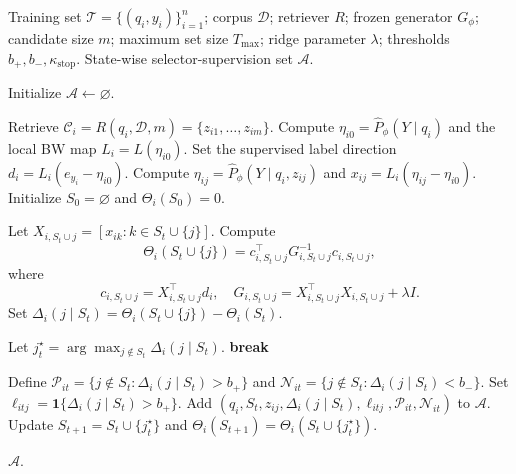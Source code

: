 \documentclass[UTF8,a4paper,12pt,oneside]{ctexart}
\numberwithin{equation}{section}
\begin{document}
\begin{algorithm}[t]
\caption{CBWDM Greedy Teacher for Selector Supervision}
\label{alg:cbwdm-teacher}
\small
\begin{algorithmic}[1]
\REQUIRE Training set $\mathcal T=\{(q_i,y_i)\}_{i=1}^n$; corpus $\mathcal D$; retriever $R$; frozen generator $G_\phi$; candidate size $m$; maximum set size $T_{\max}$; ridge parameter $\lambda$; thresholds $b_+,b_-,\kappa_{\mathrm{stop}}$.
\ENSURE State-wise selector-supervision set $\mathcal A$.

\STATE Initialize $\mathcal A\leftarrow\varnothing$.

    \STATE Retrieve $\mathcal C_i=R(q_i,\mathcal D,m)=\{z_{i1},\ldots,z_{im}\}$.
    \STATE Compute $\eta_{i0}=\widehat P_\phi(Y\mid q_i)$ and the local BW map $L_i=L(\eta_{i0})$.
    \STATE Set the supervised label direction $d_i=L_i(e_{y_i}-\eta_{i0})$.
        \STATE Compute $\eta_{ij}=\widehat P_\phi(Y\mid q_i,z_{ij})$ and $x_{ij}=L_i(\eta_{ij}-\eta_{i0})$.
    \ENDFOR
    \STATE Initialize $S_0=\varnothing$ and $\Theta_i(S_0)=0$.

            \STATE Let $X_{i,S_t\cup j}=[x_{ik}:k\in S_t\cup\{j\}]$.
            \STATE Compute
            \[
            \Theta_i(S_t\cup\{j\})
            =
            c_{i,S_t\cup j}^{\top}
            G_{i,S_t\cup j}^{-1}
            c_{i,S_t\cup j},
            \]
            where
            \[
            c_{i,S_t\cup j}=X_{i,S_t\cup j}^{\top}d_i,
            \quad
            G_{i,S_t\cup j}=X_{i,S_t\cup j}^{\top}X_{i,S_t\cup j}+\lambda I.
            \]
            \STATE Set $\Delta_i(j\mid S_t)=\Theta_i(S_t\cup\{j\})-\Theta_i(S_t)$.
        \ENDFOR

        \STATE Let $j_t^\star=\arg\max_{j\notin S_t}\Delta_i(j\mid S_t)$.
            \STATE \textbf{break}
        \ENDIF

        \STATE Define $\mathcal P_{it}=\{j\notin S_t:\Delta_i(j\mid S_t)>b_+\}$ and $\mathcal N_{it}=\{j\notin S_t:\Delta_i(j\mid S_t)<b_-\}$.
            \STATE Set $\ell_{itj}=\mathbf 1\{\Delta_i(j\mid S_t)>b_+\}$.
            \STATE Add $(q_i,S_t,z_{ij},\Delta_i(j\mid S_t),\ell_{itj},\mathcal P_{it},\mathcal N_{it})$ to $\mathcal A$.
        \ENDFOR
        \STATE Update $S_{t+1}=S_t\cup\{j_t^\star\}$ and $\Theta_i(S_{t+1})=\Theta_i(S_t\cup\{j_t^\star\})$.
    \ENDFOR
\ENDFOR

\RETURN $\mathcal A$.
\end{algorithmic}
\end{algorithm}
\end{document}
